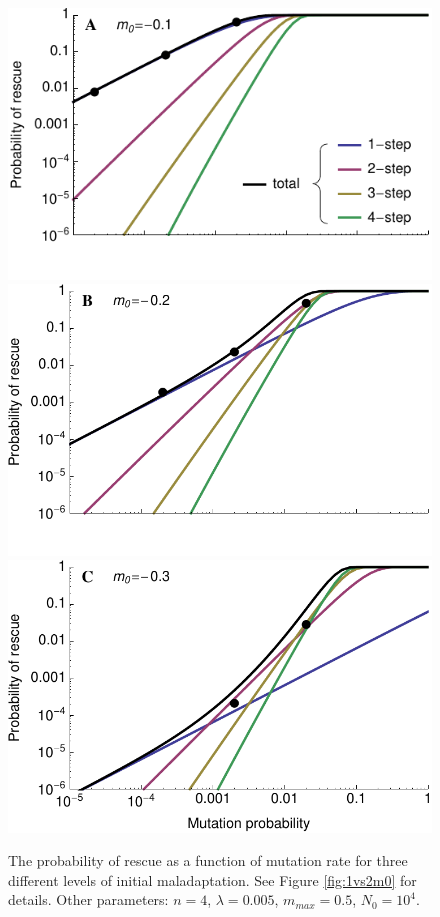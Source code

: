 \documentclass[9pt,twocolumn,twoside,lineno]{gsajnl}
\begin{document}
\begin{figure}[htbp]
\centering
\includegraphics[width=\linewidth]{4step_lowm0.pdf}\\
\includegraphics[width=\linewidth]{4step_medm0.pdf}\\
\includegraphics[width=\linewidth]{4step_highm0.pdf}\\
\caption{
The probability of rescue as a function of mutation rate for three different levels of initial maladaptation.
See Figure \ref{fig:1vs2m0} for details.
Other parameters: $n=4$, $\lambda=0.005$, $m_{max}=0.5$, $N_0=10^4$.
}%
\label{fig:1vs2U}
\end{figure}
\end{document}
